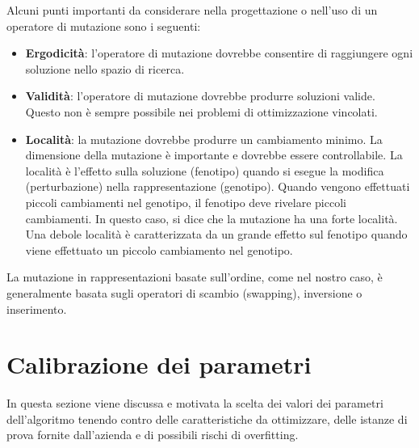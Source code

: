 Alcuni punti importanti da considerare nella progettazione o nell'uso di un operatore di mutazione sono i seguenti:

\begin{itemize}
    \item \textbf{Ergodicità}: l'operatore di mutazione dovrebbe consentire di raggiungere ogni soluzione nello spazio di ricerca.
    \item \textbf{Validità}: l'operatore di mutazione dovrebbe produrre soluzioni valide. Questo non è sempre possibile nei problemi di ottimizzazione vincolati.
    \item \textbf{Località}: la mutazione dovrebbe produrre un cambiamento minimo. La dimensione della mutazione è importante e dovrebbe essere controllabile. La località è l'effetto sulla soluzione (fenotipo) quando si esegue la modifica (perturbazione) nella rappresentazione (genotipo). Quando vengono effettuati piccoli cambiamenti nel genotipo, il fenotipo deve rivelare piccoli cambiamenti. In questo caso, si dice che la mutazione ha una forte località. Una debole località è caratterizzata da un grande effetto sul fenotipo quando viene effettuato un piccolo cambiamento nel genotipo.
\end{itemize}

La mutazione in rappresentazioni basate sull'ordine, come nel nostro caso, è generalmente basata sugli operatori di scambio (swapping), inversione o inserimento. 

\section{Calibrazione dei parametri}

In questa sezione viene discussa e motivata la scelta dei valori dei parametri dell'algoritmo tenendo contro delle caratteristiche da ottimizzare, delle istanze di prova fornite dall'azienda e di possibili rischi di overfitting.

